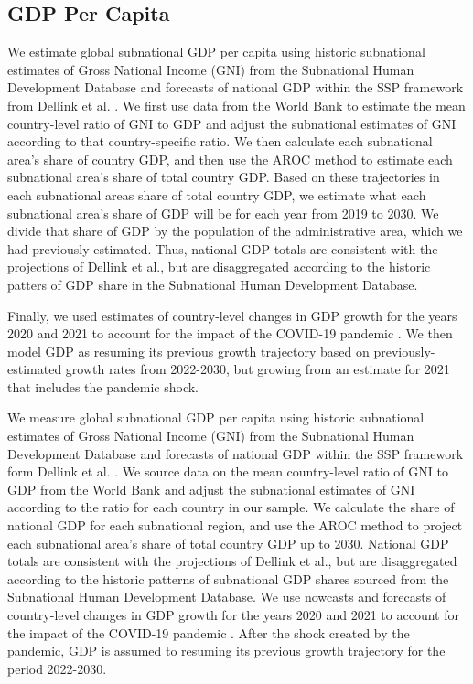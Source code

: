 \documentclass{article}
\begin{document}
\pagebreak
\subsection{GDP Per Capita}
We estimate global subnational GDP per capita using historic subnational estimates of Gross National Income (GNI) from the Subnational Human Development Database \cite{Smits2019} and forecasts of national GDP within the SSP framework from Dellink et al. \cite{Dellink2017}.  We first use data from the World Bank to estimate the mean country-level ratio of GNI to GDP and adjust the subnational estimates of GNI according to that country-specific ratio.  We then calculate each subnational area's share of country GDP, and then use the AROC method to estimate each subnational area's share of total country GDP.  Based on these trajectories in each subnational areas share of total country GDP, we estimate what each subnational area's share of GDP will be for each year from 2019 to 2030.  We divide that share of GDP by the population of the administrative area, which we had previously estimated.  Thus, national GDP totals are consistent with the projections of Dellink et al., but are disaggregated according to the historic patters of GDP share in the Subnational Human Development Database.

Finally, we used estimates of country-level changes in GDP growth for the years 2020 and 2021 to account for the impact of the COVID-19 pandemic \citep{prospects2020}.  We then model GDP as resuming its previous growth trajectory based on previously-estimated growth rates from 2022-2030, but growing from an estimate for 2021 that includes the pandemic shock.

We measure global subnational GDP per capita using historic subnational estimates of Gross National Income (GNI) from the Subnational Human Development Database \citep{Smits2019} and forecasts of national GDP within the SSP framework form Dellink et al. \citep{Dellink2017}. We source data on the mean country-level ratio of GNI to GDP from the World Bank and adjust the subnational estimates of GNI according to the ratio for each country in our sample. We calculate the share of national GDP for each subnational region, and use the AROC method to project each subnational area’s share of total country GDP up to 2030. National GDP totals are consistent with the projections of Dellink et al., but are disaggregated according to the historic patterns of subnational GDP shares sourced from the Subnational Human Development Database. We use nowcasts and forecasts of country-level changes in GDP growth for the years 2020 and 2021 to account for the impact of the COVID-19 pandemic \citep{prospects2020}. After the shock created by the pandemic, GDP is assumed to resuming its previous growth trajectory for the period 2022-2030.
\end{document}
